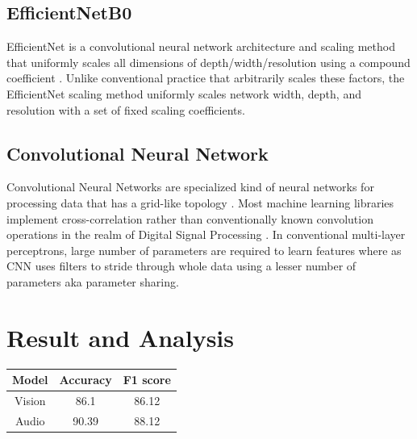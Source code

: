 \documentclass[fleqn, 10pt, twoside]{IOEGC}
\begin{document}
\subsection{EfficientNetB0}
EfficientNet is a convolutional neural network architecture and scaling method that uniformly scales all dimensions of depth/width/resolution using a compound coefficient \cite{r7}.
Unlike conventional practice that arbitrarily scales these factors, the EfficientNet scaling method uniformly scales network width, depth, and resolution with a set of fixed scaling
coefficients.
\par
\subsection{ Convolutional Neural Network}
Convolutional Neural Networks are specialized kind of neural networks for processing
data that has a grid-like topology \cite{r8}. Most machine learning libraries implement cross-correlation rather than conventionally known convolution operations in the realm of Digital
Signal Processing . In conventional multi-layer perceptrons, large number of parameters are required to learn features where as CNN uses filters to stride through whole data using a lesser number of parameters aka parameter sharing.

\section{Result and Analysis}

\begin{center}
	\begin{tabular}{ |c|c|c| }
		\hline
		Model  & Accuracy & F1 score \\
		\hline
		Vision & 86.1     & 86.12    \\
		\hline
		Audio  & 90.39    & 88.12    \\
		\hline
	\end{tabular}
\end{center}
\end{document}
